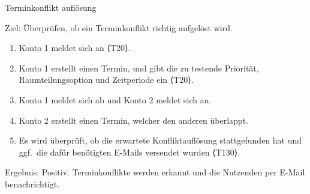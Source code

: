 \begin{scenario}{50}{Terminkonflikt auflösung}
    \item[Ziel:] Überprüfen, ob ein Terminkonflikt richtig aufgelöst wird.
    \begin{enumerate}
        \item Konto 1 meldet sich an ⟨T20⟩.
        \item Konto 1 erstellt einen Termin, und gibt die zu testende Priorität, Raumteilungsoption und Zeitperiode ein ⟨T20⟩.
        \item Konto 1 meldet sich ab und Konto 2 meldet sich an.
        \item Konto 2 erstellt einen Termin, welcher den anderen überlappt.
        \item Es wird überprüft, ob die erwartete Konfliktauflösung stattgefunden hat und ggf.\ die dafür benötigten E-Mails versendet wurden ⟨T130⟩.
    \end{enumerate}
    \item[Ergebnis:] Positiv.
    Terminkonflikte werden erkannt und die Nutzenden per E-Mail benachrichtigt.
\end{scenario}
